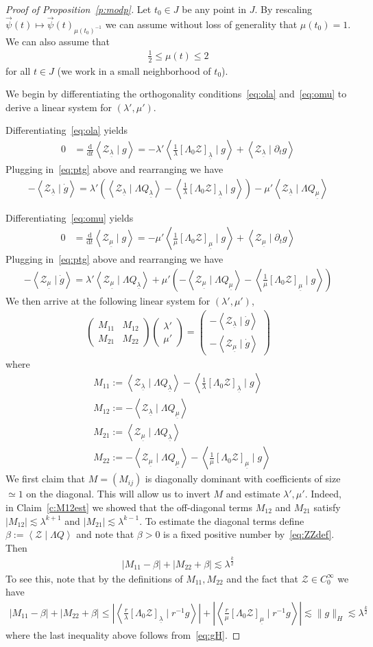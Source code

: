 \documentclass[10pt,reqno]{amsart}
\newcommand{\ZZ}{\mathcal{Z}}
\newcommand{\be}{\beta}
\newcommand{\la}{\lambda}
\newcommand{\La}{\Lambda}
\newcommand{\p}{\partial}
\newcommand{\ang}[1]{\left\langle{#1}\right\rangle}
\newcommand{\abs}[1]{\left\lvert{#1}\right\rvert}
\newcommand{\EQ}[1]{\begin{equation}\begin{split} #1 \end{split}\end{equation}}
\newcommand{\pmat}[1]{\begin{pmatrix} #1 \end{pmatrix}}
\numberwithin{equation}{section}
\theoremstyle{remark}
\newcommand{\dd}[1]{\frac{\ud}{\ud{#1}}}
\newcommand{\ula}{\underline{\lambda}}
\newcommand{\umu}{\underline{\mu}}
\newcommand{\ud}{\mathrm{d}}
\newcommand{\0}{\emptyset}
\begin{document}
\begin{proof}[Proof of Proposition~\ref{p:modp}]
Let $t_0 \in J$ be any point in $J$. By rescaling  $ \vec \psi(t) \mapsto \vec \psi(t)_{\mu(t_0)^{-1}}$ we can assume without loss of generality that $\mu(t_0) = 1$.
We can also assume that
\EQ{ \label{eq:mu12} 
\frac{1}{2} \le \mu(t) \le 2 
}
for all $t \in J$ (we work in a small neighborhood of $t_0$).

We begin by differentiating the orthogonality conditions~\eqref{eq:ola} and~\eqref{eq:omu} to derive a linear system for $(\la', \mu')$.

Differentiating~\eqref{eq:ola} yields 
 \EQ{
  0 &= \dd t \ang{ \ZZ_{\ula} \mid g} = - \lambda' \ang{\frac{1}{\la} [\La_0 \ZZ]_{\ula} \mid  g} + \ang{\ZZ_{\ula} \mid  \p_t g}  
  }
  Plugging in~\eqref{eq:ptg}  above and rearranging  we have 
  \EQ{
 - \ang{ \ZZ_{\ula} \mid \dot g} =    \la' \left(\ang{\ZZ_{\ula} \mid \La Q_{\ula}} -  \ang{\frac{1}{\la} [\La_0 \ZZ]_{\ula} \mid  g} \right) -  \mu' \ang{ \ZZ_{\ula} \mid \La Q_{\umu}} 
  }

Differentiating~\eqref{eq:omu} yields 
 \EQ{
  0 &= \dd t \ang{ \ZZ_{\umu} \mid g} = - \mu' \ang{\frac{1}{\mu} [\La_0 \ZZ]_{\umu} \mid  g} + \ang{\ZZ_{\umu} \mid  \p_t g}  
  }
  Plugging in~\eqref{eq:ptg}  above and rearranging  we have 
  \EQ{
 - \ang{ \ZZ_{\umu} \mid \dot g} =    \la' \ang{\ZZ_{\umu} \mid \La Q_{\ula}} +   \mu' \left({-} \ang{ \ZZ_{\umu} \mid \La Q_{\umu}} -  \ang{\frac{1}{\mu} [\La_0 \ZZ]_{\umu} \mid  g} \right) 
  }
  We then arrive at the following linear system for $(\la', \mu')$, 
  \EQ{
  \pmat{ M_{11} & M_{12} \\ M_{21} & M_{22}} \pmat{ \la' \\ \mu'} =  \pmat{ {-}\ang{\ZZ_{\ula} \mid  \dot g} \\ -  \ang{ \ZZ_{\umu} \mid \dot g} }
  }
  where
  \EQ{ \label{eq:Mmat} 
 & M_{11} :=  \ang{\ZZ_{\ula} \mid \La Q_{\ula}} -  \ang{\frac{1}{\la} [\La_0 \ZZ]_{\ula} \mid  g}  \\
  & M_{12} := -\ang{ \ZZ_{\ula} \mid \La Q_{\umu}}  \\ 
  &M_{21}:= \ang{\ZZ_{\umu} \mid \La Q_{\ula}}  \\
  & M_{22}:= - \ang{ \ZZ_{\umu} \mid \La Q_{\umu}} -  \ang{\frac{1}{\mu} [\La_0 \ZZ]_{\umu} \mid  g}
  }
 We first claim that $M = (M_{ij})$ is diagonally dominant with coefficients of size $\simeq 1$ on the diagonal. This will allow us to invert $M$ and estimate $\la', \mu'$.  Indeed, in Claim~\ref{c:M12est} we showed that the off-diagonal terms $M_{12}$ and $M_{21}$ satisfy $\abs{M_{12}} \lesssim \la^{k+1}$ and $\abs{M_{21}} \lesssim \la^{k-1}$. To estimate the diagonal terms define $ \be := \ang{  \ZZ \mid \La Q}$ and note that $\be>0$ is a fixed positive number by~\eqref{eq:ZZdef}.  Then 
  \EQ{
  \abs{M_{11} - \be } + \abs{ M_{22} + \be } \lesssim \la^{\frac{k}{2}}
  }
  To see this, note that by the definitions of $M_{11}, M_{22}$ and the fact that $\ZZ \in C^{\infty}_0$ we have 
  \EQ{
   \abs{M_{11}-\be} + \abs{ M_{22} + \be } \le  \abs{\ang{ \frac{r}{\la} [\La_0 \ZZ]_{\ula} \mid r^{-1} g}} + \abs{\ang{ \frac{r}{\mu}[\La_0 \ZZ]_{\umu} \mid r^{-1}g}} \lesssim \|g \|_{H} \lesssim \la^{\frac{k}{2}}
   }
   where the last inequality above follows from~\eqref{eq:gH}. 
 

\end{proof}
\end{document}
